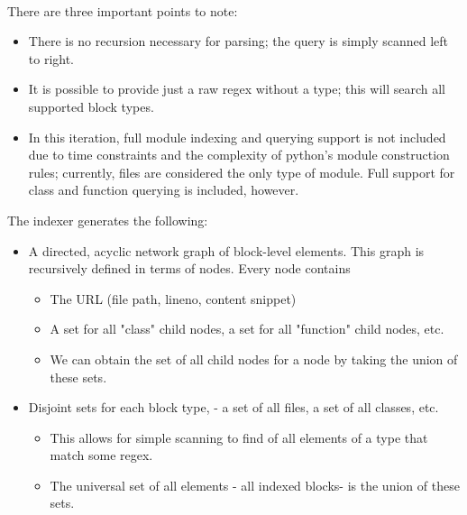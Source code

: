 \documentclass{article}
\begin{document}
\paragraph{}
There are three important points to note:
	\begin{itemize}
    \item There is no recursion necessary for parsing; the query is simply scanned left to right.
   	\item It is possible to provide just a raw regex without a type; this will search all supported block types.
    \item In this iteration, full module indexing and querying support is not included due to time constraints and the complexity of python's module construction rules; currently, files are considered the only type of module. Full support for class and function querying is included, however.
	\end{itemize}
The indexer generates the following:
	\begin{itemize}
	\item A directed, acyclic network graph of block-level elements. This graph is recursively defined in terms of nodes. Every node contains
       \begin{itemize} 
       	\item The URL (file path, lineno, content snippet)
        \item A set for all "class" child nodes, a set for all "function" child nodes, etc.
        \item We can obtain the set of all child nodes for a node by taking the union of these sets.
       \end{itemize}
    \item Disjoint sets for each block type, - a set of all files, a set of all classes, etc.
    	\begin{itemize}
    	\item This allows for simple scanning to find of all elements of a type that match some regex.
    	\item The universal set of all elements - all indexed blocks- is the union of these sets.
    	\end{itemize}
	\end{itemize}
\newpage

\end{document}
